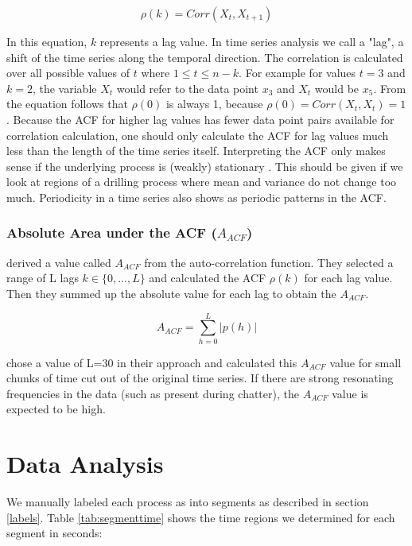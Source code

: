 \documentclass[12 pt]{scrartcl}
\begin{document}
\[ \rho(k) = Corr(X_t, X_{t+1}) \]

In this equation, $k$ represents a lag value. In time series analysis we call a "lag", a shift of the time series along the temporal direction. The correlation is calculated over all possible values of $t$ where $1 \le t \le n - k$. For example for values $t = 3$ and $k = 2$, the variable $X_t$ would refer to the data point $x_3$ and $X_t$ would be $x_5$. From the equation follows that $\rho(0)$ is always 1, because $\rho(0) = Corr(X_t, X_t) = 1$. Because the ACF for higher lag values has fewer data point pairs available for correlation calculation, one should only calculate the ACF for lag values much less than the length of the time series itself.
Interpreting the ACF only makes sense if the underlying process is (weakly) stationary \citep[p.~4]{deistler2022time}. This should be given if we look at regions of a drilling process where mean and variance do not change too much. Periodicity in a time series also shows as periodic patterns in the ACF.

\subsubsection{Absolute Area under the ACF ($A_{ACF}$)}

\citet{weinert2001statistics} derived a value called $A_{ACF}$ from the auto-correlation function. They selected a range of L lags $k \in \{0, ..., L\}$ and calculated the ACF $\rho(k)$ for each lag value. Then they summed up the absolute value for each lag to obtain the $A_{ACF}$.

\[ A_{ACF} = \sum^{L}_{h=0}{|p(h)|} \]

\citet{weinert2001statistics} chose a value of L=30 in their approach and calculated this $A_{ACF}$ value for small chunks of time cut out of the original time series. If there are strong resonating frequencies in the data (such as present during chatter), the $A_{ACF}$ value is expected to be high.

\section{Data Analysis}

We manually labeled each process as into segments as described in section \ref{labels}. Table \ref{tab:segmenttime} shows the time regions we determined for each segment in seconds:
\end{document}
